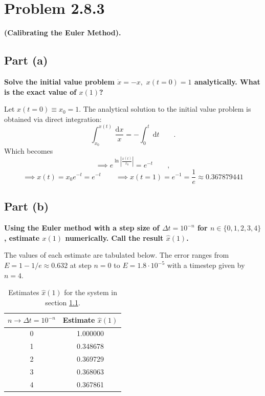 \documentclass[draft]{agujournal2019}
\begin{document}
\newpage
\section{Problem 2.8.3}
\label{sec:p5}



\textbf{(Calibrating the Euler Method).}
\par


\subsection{Part (a)}
\label{subsec:p5a}
\textbf{Solve the initial value problem $\dot x = -x,\,\,x(t=0)=1$ analytically. What is the exact value of $x(1)$?}

Let $x(t=0) \equiv x_0 = 1$. The analytical solution to the initial value problem is obtained via direct integration:
\begin{equation*}
    \int_{x_0}^{x(t)} \,\frac{\mathrm{d}x}{x} = - \int_0^t \, \mathrm{d}t \qquad .
\end{equation*}
Which becomes 
\begin{equation*}
    \implies e^{\ln{\left|\frac{x(t)}{x_0}\right|}} = e^{-t} \qquad ,
\end{equation*}
\begin{equation*}
    \implies x(t) = x_0 e^{-t} = e^{-t} \qquad \implies x(t=1) = e^{-1} = \frac{1}{e} \approx 0.367879441
\end{equation*}


\subsection{Part (b)}
\label{subsec:p5b}
\textbf{Using the Euler method with a step size of $\Delta t = 10^{-n}$ for $n\in\{0,1,2,3,4\}$, estimate $x(1)$ numerically. Call the result $\hat{x}(1)$.}

The values of each estimate are tabulated below. The error ranges from $E=1-1/e\approx0.632$ at step $n=0$ to $E=1.8\cdot10^{-5}$ with a timestep given by $n=4$. 

\begin{table}
    \centering
    \begin{tabular}{cc}
    \toprule %
        \textbf{$n\longrightarrow\Delta t=10^{-n}$} & \textbf{Estimate $\hat{x}(1)$} \\
        \midrule %
        0 & 1.000000\\
        1 & 0.348678\\
        2 & 0.369729\\
        3 & 0.368063\\
        4 & 0.367861\\
        \bottomrule
    \end{tabular}
    \caption{Estimates $\hat{x}(1)$ for the system in section \ref{subsec:p5a}. }
    \label{tab:p5b}
\end{table}
\end{document}
